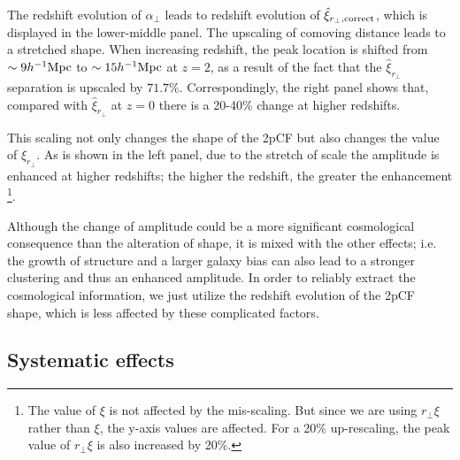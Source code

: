 \documentclass[iop]{emulateapj}
\begin{document}
The redshift evolution of $\alpha_{\perp}$ leads to redshift evolution of 
$\hat \xi_{r_\perp, \rm correct}$,
which is displayed in the lower-middle panel.
The upscaling of comoving distance leads to a stretched shape.
When increasing redshift,
the peak location is shifted from $\sim9h^{-1} \rm Mpc$ to $\sim15 h^{-1}\rm Mpc$ at $z=2$,
as a result of the fact that the $\hat\xi_{r_{\perp}}$ separation is upscaled by $71.7\%$.
Correspondingly, the right panel shows that, 
compared with $\hat \xi_{r_\perp}$ at $z=0$ there is a 20-40\% change at higher redshifts.

This scaling not only changes the shape of the 2pCF but also changes the value of $ \xi_{r_\perp}$. %
As is shown in the left panel, due to the stretch of scale the amplitude is enhanced at higher redshifts;
the higher the redshift, the greater the enhancement
\footnote{The value of $\xi$ is not affected by the mis-scaling. 
But since we are using $r_\perp\xi$ rather than $\xi$, the y-axis values are affected. 
For a 20\% up-rescaling, the peak value of $r_\perp\xi$ is also increased by 20\%.}.%

Although the change of amplitude could be a more significant cosmological consequence 
than the alteration of shape,
it is mixed with the other effects; i.e.
the growth of structure and a larger galaxy bias can also lead to a stronger clustering and thus an enhanced amplitude.
In order to reliably extract the cosmological information, 
we just utilize the redshift evolution of the 2pCF shape, 
which is less affected by these complicated factors.


\subsection{Systematic effects}
\end{document}
